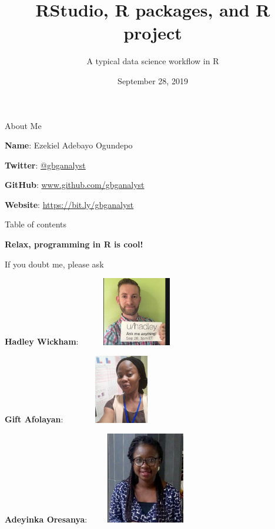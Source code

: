 \documentclass[
  ignorenonframetext,
]{beamer}
\title{RStudio, R packages, and R project}
\subtitle{A typical data science workflow in R}
\date{September 28, 2019}
\begin{document}
\frame{\titlepage}


\begin{frame}{About Me}
\protect\hypertarget{about-me}{}
\pause

\textbf{Name}: Ezekiel Adebayo Ogundepo \pause

\textbf{Twitter}: \href{https://twitter.com/gbganalyst}{@gbganalyst}
\pause

\textbf{GitHub}: \url{www.github.com/gbganalyst} \pause

\textbf{Website}: \url{https://bit.ly/gbganalyst}

\end{frame}

\begin{frame}{Table of contents}
	\tableofcontents[hideallsubsections]
\end{frame}

\begin{frame}

\begin{center}
\textbf{Relax, programming in R is cool!}
\end{center}
\pause
If you doubt me, please ask \pause

\begin{multicols}{3}
\textbf{Hadley Wickham}: \includegraphics[height=3cm, width=5cm]{Images/Hadley.JPG}

\pause
\textbf{Gift Afolayan}: \includegraphics[height=3cm, width=5cm]{Images/Ebun2.JPG} \pause

\textbf{Adeyinka
Oresanya}: \includegraphics[height=4cm, width=5cm]{Images/Oresanya.JPG}

\end{multicols}
\end{frame}
\end{document}
